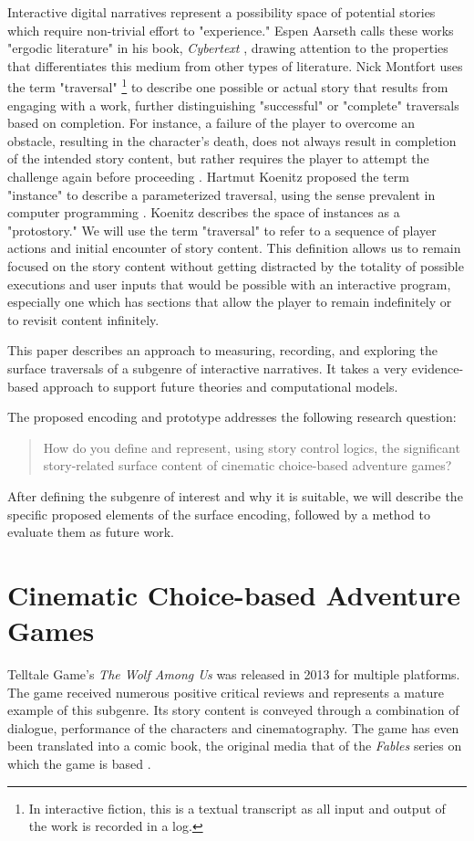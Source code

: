 \documentclass{llncs}
\begin{document}
Interactive digital narratives represent a possibility space of
potential stories which require non-trivial effort to "experience."
Espen Aarseth calls these works "ergodic literature" in his book,
\emph{Cybertext} \cite{Aarseth1997}, drawing attention to the properties
that differentiates this medium from other types of literature. Nick
Montfort uses the term "traversal" \footnote{In interactive fiction, this is a textual transcript as all
input and output of the work is recorded in a log.} to describe one possible or
actual story that results from engaging with a work, further
distinguishing "successful" or "complete" traversals based on
completion.  For instance, a failure of the player to overcome an
obstacle, resulting in the character's death, does not always result
in completion of the intended story content, but rather requires the
player to attempt the challenge again before proceeding
\cite{Montfort2006}. Hartmut Koenitz proposed the term "instance" to
describe a parameterized traversal, using the sense prevalent in
computer programming \cite{Hartmut2015}.  Koenitz describes the space
of instances as a "protostory." We will use the term "traversal" to
refer to a sequence of player actions and initial encounter of story
content. This definition allows us to remain focused on the story
content without getting distracted by the totality of possible
executions and user inputs that would be possible with an interactive
program, especially one which has sections that allow the player to
remain indefinitely or to revisit content infinitely.

This paper describes an approach to measuring, recording, and
exploring the surface traversals of a subgenre of interactive
narratives. It takes a very evidence-based approach to support future
theories and computational models. 

The proposed encoding and prototype addresses the following research
question:

\begin{quote}
How do you define and represent, using story control logics, the
significant story-related surface content of cinematic choice-based
adventure games?
\end{quote}

After defining the subgenre of interest and why it is suitable, we
will describe the specific proposed elements of the surface encoding,
followed by a method to evaluate them as future work.

\section*{Cinematic Choice-based Adventure Games}
\label{sec:orgheadline3}
Telltale Game’s \emph{The Wolf Among Us} was released in 2013 for multiple
platforms. The game received numerous positive critical reviews and
represents a mature example of this subgenre. Its story content is
conveyed through a combination of dialogue, performance of the
characters and cinematography. The game has even been translated into
a comic book, the original media that of the \emph{Fables} series on which
the game is based \cite{Sturges2014}. 
\end{document}
